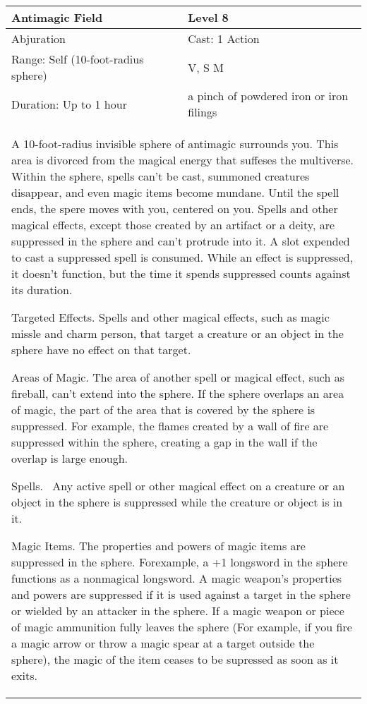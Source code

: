 \documentclass[11pt]{report}
\begin{document}
\begin{table}[H]
	\begin{tabular}{||p{6cm}|p{6cm}||}
		\hline\hline
		\bf{Antimagic Field} & Level 8\\ \hline
		Abjuration & Cast: 1 Action\\ \hline
		Range: Self (10-foot-radius sphere) & V, S M\\ \hline
		Duration: Up to 1 hour & a pinch of powdered iron or iron filings\\ \hline
		\multicolumn{2}{||p{12cm}||}{A 10-foot-radius invisible sphere of antimagic surrounds you. 
This area is divorced from the magical energy that suffeses the multiverse. Within the sphere, spells can’t be cast, summoned creatures disappear, and even magic items become mundane. Until the spell ends, the spere moves with you, centered on you. 
Spells and other magical effects, except those created by an artifact or a deity, are suppressed in the sphere and can’t protrude into it. A slot expended to cast a suppressed spell is consumed. While an effect is suppressed, it doesn’t function, but the time it spends suppressed counts against its duration. 

Targeted Effects. 
Spells and other magical effects, such as magic missle and charm person, that target a creature or an object in the sphere have no effect on that target. 

Areas of Magic. 
The area of another spell or magical effect, such as fireball, can’t extend into the sphere. If the sphere overlaps an area of magic, the part of the area that is covered by the sphere is suppressed. For example, the flames created by a wall of fire are suppressed within the sphere, creating a gap in the wall if the overlap is large enough. 

Spells. 
 Any active spell or other magical effect on a creature or an object in the sphere is suppressed while the creature or object is in it. 

Magic Items. 
The properties and powers of magic items are suppressed in the sphere. Forexample, a +1 longsword in the sphere functions as a nonmagical longsword. A magic weapon’s properties and powers are suppressed if it is used against a target in the sphere or wielded by an attacker in the sphere. If a magic weapon or piece of magic ammunition fully leaves the sphere (For example, if you fire a magic arrow or throw a magic spear at a target outside the sphere), the magic of the item ceases to be supressed as soon as it exits. 

}
\end{tabular}
\end{table}
\end{document}
